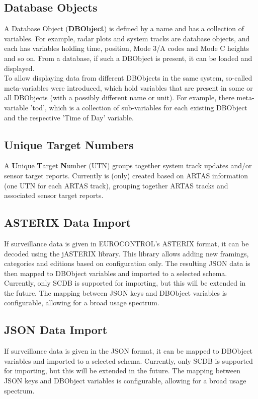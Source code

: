 \subsection*{Database Objects}
A Database Object (\textbf{DBObject}) is defined by a name and has a collection of variables. For example, radar plots and system tracks are database objects, and each has variables holding time, position, Mode 3/A codes and Mode C heights and so on. From a database, if such a DBObject is present, it can be loaded and displayed.\\

To allow displaying data from different DBObjects in the same system, so-called meta-variables were introduced, which hold variables that are present in some or all DBObjects (with a possibly different name or unit).  For example, there meta-variable 'tod', which is a collection of sub-variables for each existing DBObject and the respective 'Time of Day' variable.

\subsection*{Unique Target Numbers}
A \textbf{U}nique \textbf{T}arget \textbf{N}umber (UTN) groups together system track updates and/or sensor target reports.
Currently is (only) created based on ARTAS information (one UTN for each ARTAS track), grouping together ARTAS tracks and associated sensor target reports.

\subsection*{ASTERIX Data Import}
If surveillance data is given in EUROCONTROL's ASTERIX format, it can be decoded using the jASTERIX library. This library allows adding new framings, categories and editions based on configuration only. The resulting JSON data is then mapped to DBObject variables and imported to a selected schema. Currently, only SCDB is supported for importing, but this will be extended in the future. The mapping between JSON keys and DBObject variables is configurable, allowing for a broad usage spectrum.

\subsection*{JSON Data Import}
If surveillance data is given in the JSON format, it can be mapped to DBObject variables and imported to a selected schema. Currently, only SCDB is supported for importing, but this will be extended in the future. The mapping between JSON keys and DBObject variables is configurable, allowing for a broad usage spectrum.


